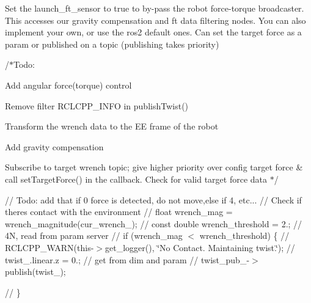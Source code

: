 Set the launch\+\_\+ft\+\_\+sensor to true to by-\/pass the robot force-\/torque broadcaster. This accesses our gravity compensation and ft data filtering nodes. You can also implement your own, or use the ros2 default ones. Can set the target force as a param or published on a topic (publishing takes priority)

/$\ast$\+Todo\+:
\begin{DoxyItemize}
\item Add angular force(torque) control
\item Remove filter RCLCPP\+\_\+\+INFO in publish\+Twist()
\item Transform the wrench data to the EE frame of the robot
\item Add gravity compensation
\item Subscribe to target wrench topic; give higher priority over config target force \& call set\+Target\+Force() in the callback. Check for valid target force data $\ast$/

// Todo\+: add that if 0 force is detected, do not move,else if 4, etc... // Check if there\textquotesingle{}s contact with the environment // float wrench\+\_\+mag = wrench\+\_\+magnitude(cur\+\_\+wrench\+\_\+); // const double wrench\+\_\+threshold = 2.; // 4N, read from param server // if (wrench\+\_\+mag $<$ wrench\+\_\+threshold) \{ // RCLCPP\+\_\+\+WARN(this-\/$>$get\+\_\+logger(), \char`\"{}\+No Contact. Maintaining twist.\char`\"{}); // twist\+\_\+.\+linear.\+z = 0.; // get from dim and param // twist\+\_\+pub\+\_\+-\/$>$publish(twist\+\_\+);

// \} 
\end{DoxyItemize}